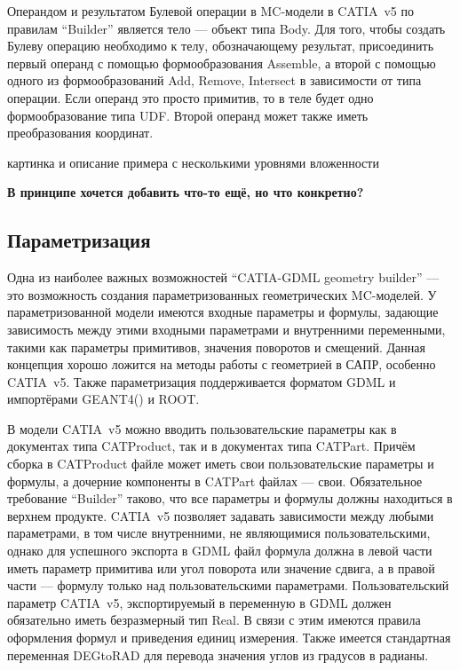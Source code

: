 Операндом и результатом Булевой операции в MC-модели в CATIA~v5 по правилам ``Builder'' является тело --- объект типа Body. Для того, чтобы создать Булеву операцию необходимо к телу, обозначающему результат, присоединить первый операнд с помощью формообразования Assemble, а второй с помощью одного из формообразований Add, Remove, Intersect в зависимости от типа операции. Если операнд это просто примитив, то в теле будет одно формообразование типа UDF. Второй операнд может также иметь преобразования координат.

\todo картинка и описание примера с несколькими уровнями вложенности

\todo \textbf{В принципе хочется добавить что-то ещё, но что конкретно?}

\subsection{Параметризация}\label{sec:Parameterization}

Одна из наиболее важных возможностей ``CATIA-GDML geometry builder'' --- это возможность создания параметризованных геометрических MC-моделей. У параметризованной модели имеются входные параметры и формулы, задающие зависимость между этими входными параметрами и внутренними переменными, такими как параметры примитивов, значения поворотов и смещений. Данная концепция хорошо ложится на методы работы с геометрией в САПР, особенно CATIA~v5. Также параметризация поддерживается форматом GDML и импортёрами GEANT4(\todo) и ROOT.

В модели CATIA~v5 можно вводить пользовательские параметры как в документах типа CATProduct, так и в документах типа CATPart. Причём сборка в CATProduct файле может иметь свои пользовательские параметры и формулы, а дочерние компоненты в CATPart файлах --- свои. Обязательное требование ``Builder'' таково, что все параметры и формулы должны находиться в верхнем продукте. CATIA~v5 позволяет задавать зависимости между любыми параметрами, в том числе внутренними, не являющимися пользовательскими, однако для успешного экспорта в GDML файл формула должна в левой части иметь параметр примитива или угол поворота или значение сдвига, а в правой части --- формулу только над пользовательскими параметрами. Пользовательский параметр CATIA~v5, экспортируемый в переменную в GDML должен обязательно иметь безразмерный тип Real. В связи с этим имеются правила оформления формул и приведения единиц измерения. Также имеется стандартная переменная DEGtoRAD для перевода значения углов из градусов в радианы.


